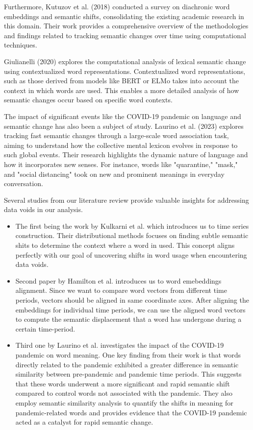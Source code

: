 \documentclass[12pt]{article}
\begin{document}
Furthermore, Kutuzov et al. (2018) conducted a survey on diachronic word embeddings and semantic shifts, consolidating the existing academic research in this domain.
Their work provides a comprehensive overview of the methodologies and findings related to tracking semantic changes over time using computational techniques.

Giulianelli (2020) explores the computational analysis of lexical semantic change using contextualized word representations.
Contextualized word representations, such as those derived from models like BERT or ELMo takes into account the context in which words are used.
This enables a more detailed analysis of how semantic changes occur based on specific word contexts.

The impact of significant events like the COVID-19 pandemic on language and semantic change has also been a subject of study.
Laurino et al. (2023) explores tracking fast semantic changes through a large-scale word association task, aiming to understand how the collective mental lexicon evolves in response to such global events.
Their research highlights the dynamic nature of language and how it incorporates new senses.
For instance, words like "quarantine," "mask," and "social distancing" took on new and prominent meanings in everyday conversation.

 \vspace{5mm}
Several studies from our literature review provide valuable insights for addressing data voids in our analysis.
\begin{itemize}
    \item The first being the work by Kulkarni et al. which introduces us to time series construction.
Their distributional methods focuses on finding subtle semantic shits to determine the context where a word in used.
This concept aligns perfectly with our goal of uncovering shifts in word usage when encountering data voids.
    \item Second paper by Hamilton et al. introduces us to word emebeddings alignment.
Since we want to compare word vectors from different time periods, vectors should be aligned in same coordinate axes.
After aligning the embeddings for individual time periods, we can use the aligned word vectors to compute the semantic displacement that a word has undergone during a certain time-period.
    \item Third one by Laurino et al. investigates the impact of the COVID-19 pandemic on word meaning.
One key finding from their work is that words directly related to the pandemic exhibited a greater difference in semantic similarity between pre-pandemic and pandemic time periods.
This suggests that these words underwent a more significant and rapid semantic shift compared to control words not associated with the pandemic.
They also employ semantic similarity analysis to quantify the shifts in meaning for pandemic-related words and provides evidence that the COVID-19 pandemic acted as a catalyst for rapid semantic change.

\end{itemize}
\end{document}
